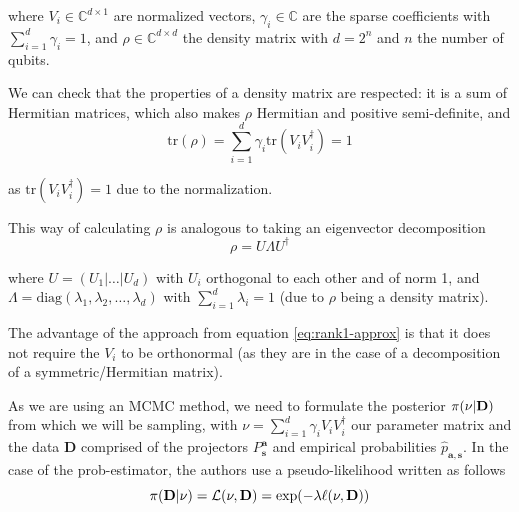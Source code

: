 \documentclass[12pt]{memoir}
\newcommand{\tr}{\text{tr}}
\newcommand{\mb}{\mathbf}
\newcommand{\tb}{\textbf}
\begin{document}
where $V_i \in \mathbb{C}^{d\times 1}$ are normalized vectors, $\gamma_i \in \mathbb{C}$ are the sparse coefficients with $\sum_{i=1}^d \gamma_i = 1$, and $\rho \in \mathbb{C}^{d\times d}$ the density matrix with $d=2^n$ and $n$ the number of qubits.\medbreak


We can check that the properties of a density matrix are respected: it is a sum of Hermitian matrices, which also makes $\rho$ Hermitian and positive semi-definite, and
\begin{equation}
    \tr(\rho) = \sum_{i=1}^{d} \gamma_i \tr(V_i V_i^\dagger) = 1
\end{equation}

as $\tr(V_i V_i^\dagger) = 1$ due to the normalization.\medbreak







This way of calculating $\rho$ is analogous to taking an eigenvector decomposition
\begin{equation}
    \rho = U\Lambda U^\dagger
\end{equation}

where $U = (U_1|\dots|U_d)$ with $U_i$ orthogonal to each other and of norm 1, and $\Lambda = \text{diag}(\lambda_1, \lambda_2, \dots, \lambda_d)$ with $\sum_{i=1}^d \lambda_i = 1$ (due to $\rho$ being a density matrix).\medbreak


The advantage of the approach from equation \ref{eq:rank1-approx} is that it does not require the $V_i$ to be orthonormal (as they are in the case of a decomposition of a symmetric/Hermitian matrix). \medbreak

As we are using an MCMC method, we need to formulate the posterior $\pi(\nu | \tb D)$ from which we will be sampling, with $\nu = \sum_{i=1}^d \gamma_i V_i V_i^\dagger$ our parameter matrix and the data $\mb D$ comprised of the projectors $P^{\mb a}_{\mb s}$ and empirical probabilities $\hat p_{\mb a,\mb s}$. In the case of the prob-estimator, the authors use a pseudo-likelihood written as follows
\begin{equation}
    \pi(\tb D| \nu) = \mathcal{L}(\nu, \mb D) = \exp(-\lambda \ell(\nu,\mb D))
\end{equation}
\end{document}
